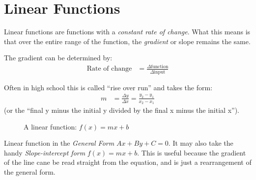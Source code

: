%
\clearpage
\section{Linear Functions}
\label{sec:LinearFunctions}
Linear functions are functions with a \emph{constant rate of change}. What this
means is that over the entire range of the function, the \emph{gradient} or
slope remains the same.

The gradient can be determined by:
\begin{align}
  \text{Rate of change} & = \frac{\Delta\text{function}}{\Delta\text{input}}
\end{align}

Often in high school this is called ``rise over run'' and takes the form:
\begin{align}
  m & = \frac{\Delta y}{\Delta x}  = \frac{y_2 - y_1}{x_2 - x_1}
\end{align}
(or the ``final y minus the initial y divided by the final x minus the initial
x'').

\begin{figure}[!hbt]     
\label{fig:FuncGraphLinear}
\caption{A linear function: $f(x) = mx + b$}
\end{figure}

%
Linear function in the \emph{General Form} $Ax + By + C= 0$. It may also take
the handy \emph{Slope-intercept form} $ f(x) = mx + b $. This is useful because
the gradient of the line cane be read straight from the equation, and is just
a rearrangement of the general form.


